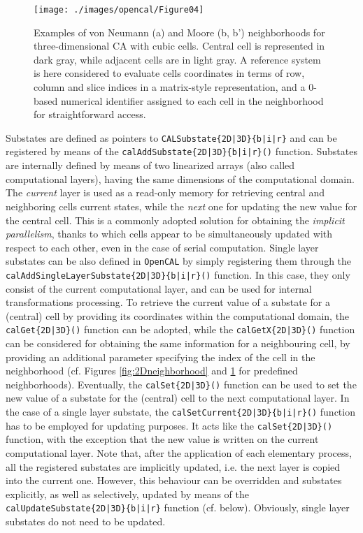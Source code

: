 \begin{figure}
	\begin{center}
		\texttt{[image: ./images/opencal/Figure04]}
		\caption{Examples of von Neumann (a) and Moore (b, b') neighborhoods for
			three-dimensional CA with cubic cells. Central cell is represented in
			dark gray, while adjacent cells are in light gray. A reference system
			is here considered to evaluate cells coordinates in terms of row,
			column and slice indices in a matrix-style representation, and a
			0-based numerical identifier assigned to each cell in the neighborhood
			for straightforward access.}
		\label{fig:3Dneighborhood}
	\end{center}
\end{figure}

Substates are defined as pointers to
\verb'CALSubstate{2D|3D}{b|i|r}' and can be registered by means of
the \verb'calAddSubstate{2D|3D}{b|i|r}()' function. Substates are
internally defined by means of two linearized arrays (also called
computational layers), having the same dimensions of the
computational domain. The \emph{current} layer is used as a
read-only memory for retrieving central and neighboring cells
current states, while the \emph{next} one for updating the new value
for the central cell. This is a commonly adopted solution for
obtaining the \emph{implicit parallelism}, thanks to which cells
appear to be simultaneously updated with respect to each other, even
in the case of serial computation. Single layer substates can be
also defined in \texttt{OpenCAL} by simply registering them through the
\verb'calAddSingleLayerSubstate{2D|3D}{b|i|r}()' function. In this
case, they only consist of the current computational layer, and can
be used for internal transformations processing. To retrieve the
current value of a substate for a (central) cell by providing its
coordinates within the computational domain, the
\verb'calGet{2D|3D}()' function can be adopted, while the
\verb'calGetX{2D|3D}()' function can be considered for obtaining the
same information for a neighbouring cell, by providing an additional
parameter specifying the index of the cell in the neighborhood
(cf. Figures \ref{fig:2Dneighborhood} and \ref{fig:3Dneighborhood}
for predefined neighborhoods). Eventually, the
\verb'calSet{2D|3D}()' function can be used to set the new value of
a substate for the (central) cell to the next computational
layer. In the case of a single layer substate, the
\verb'calSetCurrent{2D|3D}{b|i|r}()' function has to be employed for
updating purposes. It acts like the \verb'calSet{2D|3D}()' function,
with the exception that the new value is written on the current
computational layer. Note that, after the application of each
elementary process, all the registered substates are implicitly
updated, i.e. the next layer is copied into the current
one. However, this behaviour can be overridden and substates
explicitly, as well as selectively, updated by means of the
\verb'calUpdateSubstate{2D|3D}{b|i|r}' function
(cf. below). Obviously, single layer substates do not need to be
updated.

